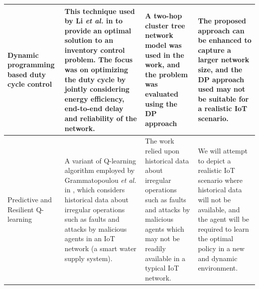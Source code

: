 \documentclass[journal]{IEEEtran}
\begin{document}
\begin{landscape}
\begin{table}
\begin{tabular}{llll}
\multicolumn{1}{m{3cm}}{Dynamic programming based duty cycle control} & \multicolumn{1}{m{6cm}}{This technique used by Li \emph{et al.} in \cite{Li2014} to provide an optimal solution to an inventory control problem. The focus was on optimizing the duty cycle by jointly considering energy efficiency, end-to-end delay and reliability of the network.} & \multicolumn{1}{m{6cm}}{A two-hop cluster tree network model was used in the work, and the problem was evaluated using the DP approach} & \multicolumn{1}{m{6cm}}{The proposed approach can be enhanced to capture a larger network size, and the DP approach used may not be suitable for a realistic IoT scenario.}\\ \hline

\multicolumn{1}{m{3cm}}{Predictive and Resilient Q-learning} & \multicolumn{1}{m{6cm}}{A variant of Q-learning algorithm employed by Grammatopoulou \emph{et al.} in \cite{Grammatopoulou2018}, which considers historical data about irregular operations such as faults and attacks by malicious agents in an IoT network (a smart water supply system).} & \multicolumn{1}{m{6cm}}{The work relied upon historical data about irregular operations such as faults and attacks by malicious agents which may not be readily available in a typical IoT network.} & \multicolumn{1}{m{6cm}}{We will attempt to depict a realistic IoT scenario where historical data will not be available, and the agent will be required to learn the optimal policy in a new and dynamic environment.}\\ \hline



\end{tabular}
\end{table}
\end{landscape}
\end{document}

